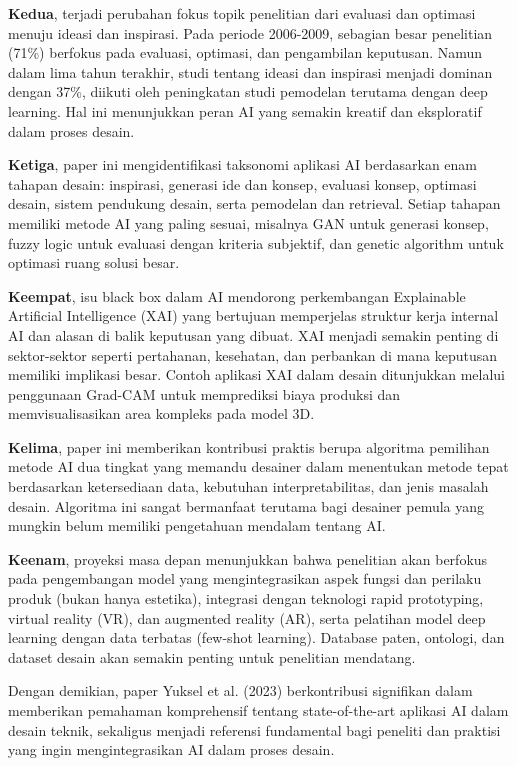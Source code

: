 \documentclass{article}
\begin{document}
\textbf{Kedua}, terjadi perubahan fokus topik penelitian dari evaluasi dan optimasi menuju ideasi dan inspirasi. Pada periode 2006-2009, sebagian besar penelitian (71\%) berfokus pada evaluasi, optimasi, dan pengambilan keputusan. Namun dalam lima tahun terakhir, studi tentang ideasi dan inspirasi menjadi dominan dengan 37\%, diikuti oleh peningkatan studi pemodelan terutama dengan deep learning. Hal ini menunjukkan peran AI yang semakin kreatif dan eksploratif dalam proses desain.

\textbf{Ketiga}, paper ini mengidentifikasi taksonomi aplikasi AI berdasarkan enam tahapan desain: inspirasi, generasi ide dan konsep, evaluasi konsep, optimasi desain, sistem pendukung desain, serta pemodelan dan retrieval. Setiap tahapan memiliki metode AI yang paling sesuai, misalnya GAN untuk generasi konsep, fuzzy logic untuk evaluasi dengan kriteria subjektif, dan genetic algorithm untuk optimasi ruang solusi besar.

\textbf{Keempat}, isu black box dalam AI mendorong perkembangan Explainable Artificial Intelligence (XAI) yang bertujuan memperjelas struktur kerja internal AI dan alasan di balik keputusan yang dibuat. XAI menjadi semakin penting di sektor-sektor seperti pertahanan, kesehatan, dan perbankan di mana keputusan memiliki implikasi besar. Contoh aplikasi XAI dalam desain ditunjukkan melalui penggunaan Grad-CAM untuk memprediksi biaya produksi dan memvisualisasikan area kompleks pada model 3D.

\textbf{Kelima}, paper ini memberikan kontribusi praktis berupa algoritma pemilihan metode AI dua tingkat yang memandu desainer dalam menentukan metode tepat berdasarkan ketersediaan data, kebutuhan interpretabilitas, dan jenis masalah desain. Algoritma ini sangat bermanfaat terutama bagi desainer pemula yang mungkin belum memiliki pengetahuan mendalam tentang AI.

\textbf{Keenam}, proyeksi masa depan menunjukkan bahwa penelitian akan berfokus pada pengembangan model yang mengintegrasikan aspek fungsi dan perilaku produk (bukan hanya estetika), integrasi dengan teknologi rapid prototyping, virtual reality (VR), dan augmented reality (AR), serta pelatihan model deep learning dengan data terbatas (few-shot learning). Database paten, ontologi, dan dataset desain akan semakin penting untuk penelitian mendatang.

Dengan demikian, paper Yuksel et al. (2023) berkontribusi signifikan dalam memberikan pemahaman komprehensif tentang state-of-the-art aplikasi AI dalam desain teknik, sekaligus menjadi referensi fundamental bagi peneliti dan praktisi yang ingin mengintegrasikan AI dalam proses desain.
\end{document}

